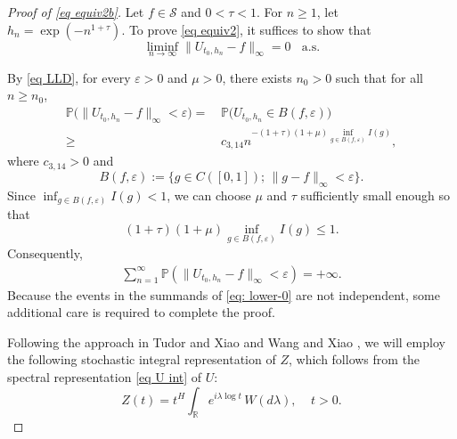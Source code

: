 \documentclass[11pt, reqno]{amsart}
\numberwithin{equation}{section}
\newcommand{\1}{{\bf 1}}
\newcommand{\2}{{\bf 2}}
\begin{document}
 \begin{proof}[Proof of \eqref{eq equiv2b}]
 Let $f\in \mathcal S$ and $0<\tau<1$. For $n\ge1$, let $h_n=\exp\left(-n^{1+\tau}\right)$. To prove  \eqref{eq equiv2}, it suffices  to show that
\begin{equation}\label{eq equiv2'}
\liminf_{n\rightarrow\infty}\|U_{t_0, h_n}-f\|_{\infty}=0 \ \ \ \ \text{a.s.}
\end{equation}

By \eqref{eq LLD},  for every $\varepsilon>0$ and $\mu>0$, there exists   $n_0>0$ such that for all $n\ge n_0$,
\begin{equation*}
\begin{split}
\mathbb P\big( \|U_{t_0, h_n}-f\|_{\infty}< \varepsilon  \big)=&\,\mathbb P\big( U_{t_0, h_n}\in  B(f,\varepsilon) \big)\\
\ge &\,     c_{3,14}  n^{-(1+\tau)(1+\mu)\inf_{g\in  B(f,\varepsilon)}  I (g) },
\end{split}
\end{equation*}
where  $c_{3,14}>0$ and
$$
B(f, \varepsilon):=\Big\{g\in C([0,1]);\, \|g-f\|_{\infty}<\varepsilon \Big\}.
$$
Since $\inf_{g\in  B(f,\varepsilon)}  I (g)<1$, we can choose  $\mu$ and $\tau$ sufficiently small enough so that
$$
 (1+\tau)(1+\mu)\inf_{g\in  B(f,\varepsilon)}  I (g) \le 1.
$$
Consequently, 
\begin{align}\label{eq: lower-0}
\sum_{n=1}^{\infty}\mathbb P\left(\|U_{t_0, h_n}-f\|_{\infty}<\varepsilon \right)=+\infty.
\end{align}
Because the events in the summands of \eqref{eq: lower-0} are not independent, some additional care
is required to  complete   the proof.

Following the approach in  Tudor and Xiao \cite{TX2007} and Wang and Xiao \cite{WX2021a},
we will employ  the following stochastic integral representation of $Z$, which follows from the spectral representation \eqref{eq U int} of $U$:
\begin{equation}\label{Eq:Rep1}
Z(t) = t^{H} \int_{\mathbb R} e^{i \lambda \log t}\,
W(d\lambda),\ \ \ \ \ t>0.
\end{equation} 


\end{proof}
\end{document}
